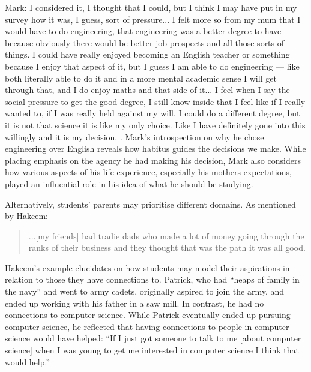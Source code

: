 {Mark: I considered it, I thought that I could, but I think I may have put in my survey how it was, I guess, sort of pressure... I felt more so from my mum that I would have to do engineering, that engineering was a better degree to have because obviously there would be better job prospects and all those sorts of things. I could have really enjoyed becoming an English teacher or something because I enjoy that aspect of it, but I guess I am able to do engineering --- like both literally able to do it and in a more mental academic sense I will get through that, and I do enjoy maths and that side of it... I feel when I say the social pressure to get the good degree, I still know inside that I feel like if I really wanted to, if I was really held against my will, I could do a different degree, but it is not that science it is like my only choice. Like I have definitely gone into this willingly and it is my decision.
}. Mark's introspection on why he chose engineering over English reveals how habitus guides the decisions we make. While placing emphasis on the agency he had making his decision, Mark also considers how various aspects of his life experience, especially his mothers expectations, played an influential role in his idea of what he should be studying. 

Alternatively, students' parents may prioritise different domains. As mentioned by Hakeem: \blockquote{...[my friends] had tradie dads who made a lot of money going through the ranks of their business and they thought that was the path it was all good.} Hakeem's example elucidates on how students may model their aspirations in relation to those they have connections to. Patrick, who had ``heaps of family in the navy'' and went to army cadets, originally aspired to join the army, and ended up working with his father in a saw mill. In contrast, he had no connections to computer science. While Patrick eventually ended up pursuing computer science, he reflected that having connections to people in computer science would have helped:  ``If I just got someone to talk to me [about computer science] when I was young to get me interested in computer science I think that would help.'' 

